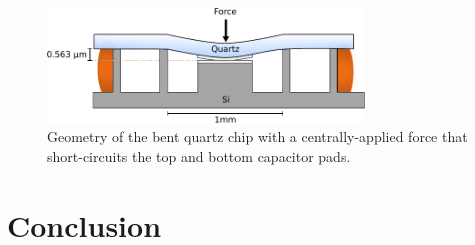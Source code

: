 \documentclass{beavtex_dub_edit}
\begin{document}
\begin{figure}
    \includegraphics[width = 0.75\textwidth]{quartz bending.pdf}
    \caption{Geometry of the bent quartz chip with a centrally-applied force that short-circuits the top and bottom capacitor pads.}
    \label{quartz bending}
\end{figure}


\section{Conclusion}
\end{document}
